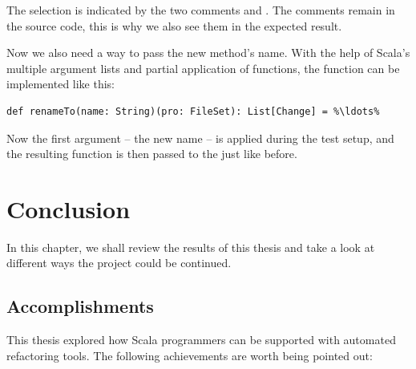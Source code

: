 \documentclass[10pt,a4paper,oneside]{scrreprt}
\begin{document}
The selection is indicated by the two comments \src{/*(*/} and \src{/*)*/}. The comments remain in the source code, this is why we also see them in the expected result. 

Now we also need a way to pass the new method's name. With the help of Scala's multiple argument lists and partial application of functions, the  function can be implemented like this:

\begin{lstlisting}
def renameTo(name: String)(pro: FileSet): List[Change] = %\ldots%
\end{lstlisting}

Now the first argument -- the new name -- is applied during the test setup, and the resulting function is then passed to the  just like before.

\chapter{Conclusion} \label{chapter:outlook}

In this chapter, we shall review the results of this thesis and take a look at different ways the project could be continued.

\section{Accomplishments}

This thesis explored how Scala programmers can be supported with automated refactoring tools. The following achievements are worth being pointed out: 
\end{document}
